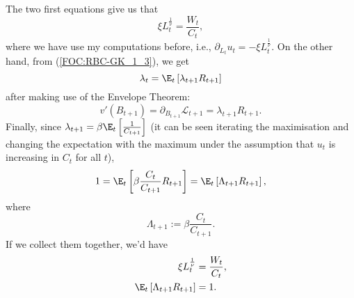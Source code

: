 \documentclass{article}
\begin{document}
	The two first equations give us that
	\begin{equation}
		\xi L_t^{\frac{1}{\nu}} = \frac{W_t}{C_t},
	\end{equation}
	where we have use my computations before, i.e., $\partial_{L_t}u_t = - \xi L_t^{\frac{1}{\nu}}$. On the other hand, from (\ref{FOC:RBC-GK_1_3}), we get
	\begin{equation}
		\lambda_t = \E_t\left[\lambda_{t+1}R_{t+1}\right]
	\end{equation}
	after making use of the Envelope Theorem:
	\begin{equation}
		v'\left(B_{t+1}\right) = \partial_{B_{t+1}}\mathcal{L}_{t+1} =  \lambda_{t+1}R_{t+1}.
	\end{equation}
	Finally, since $\lambda_{t+1} = \beta \E_t\left[\frac{1}{C_{t+1}}\right]$ (it can be seen iterating the maximisation and changing the expectation with the maximum under the assumption that $u_t$ is increasing in $C_{t}$ for all $t$),
		\begin{equation}
		1 = \E_t\left[\beta\frac{C_t}{C_{t+1}}R_{t+1}\right] = \E_t\left[\Lambda_{t+1} R_{t+1}\right],
	\end{equation}
	where
\begin{equation}\label{eq:RBC_GK_Lambda}
		\Lambda_{t+1}:= \beta \frac{C_t}{C_{t+1}}.
\end{equation}
	 If we collect them together, we'd have
	\begin{align}
			\xi L_t^{\frac{1}{\nu}} &= \frac{W_t}{C_t}, \label{FOC:RBC-GK_2_1} \\
	 \E_t\left[\Lambda_{t+1} R_{t+1}\right] &= 1.\label{FOC:RBC-GK_2_2}
	\end{align}
\end{document}
